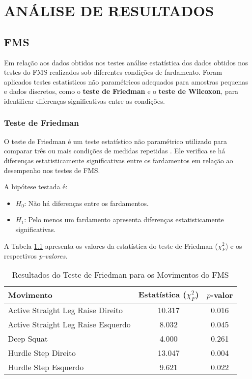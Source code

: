 \chapter{ANÁLISE DE RESULTADOS}

\section{\acrshort{FMS}}

Em relação aos dados obtidos nos testes análise estatística dos dados obtidos nos testes do \acrlong{FMS} realizados sob diferentes condições de fardamento. Foram aplicados testes estatísticos não paramétricos adequados para amostras pequenas e dados discretos, como o \textbf{teste de Friedman} e o \textbf{teste de Wilcoxon}, para identificar diferenças significativas entre as condições.

\subsection{Teste de Friedman}
O teste de Friedman é um teste estatístico não paramétrico utilizado para comparar três ou mais condições de medidas repetidas \cite{sheldon1996use}. Ele verifica se há diferenças estatisticamente significativas entre os fardamentos em relação ao desempenho nos testes de FMS.

A hipótese testada é:
\begin{itemize}
    \item $H_0$: Não há diferenças entre os fardamentos.
    \item $H_1$: Pelo menos um fardamento apresenta diferenças estatisticamente significativas.
\end{itemize}

A Tabela \ref{tab:friedman} apresenta os valores da estatística do teste de Friedman ($\chi^2_F$) e os respectivos \textit{p-valores}.

\begin{table}[H]
    \centering
    \caption{Resultados do Teste de Friedman para os Movimentos do FMS}
    \label{tab:friedman}
    \begin{tabular}{lcc}
        \hline
        \textbf{Movimento} & \textbf{Estatística ($\chi^2_F$)} & \textbf{$p$-valor} \\
        \hline
        Active Straight Leg Raise Direito  & 10.317 & 0.016  \\
        Active Straight Leg Raise Esquerdo &  8.032 & 0.045  \\
        Deep Squat                        &  4.000 & 0.261  \\
        Hurdle Step Direito               & 13.047 & 0.004  \\
        Hurdle Step Esquerdo              &  9.621 & 0.022  \\
        \hline
    \end{tabular}
\end{table}

